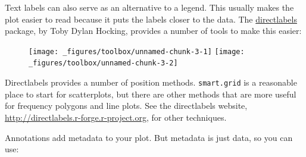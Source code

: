 Text labels can also serve as an alternative to a legend. This usually
makes the plot easier to read because it puts the labels closer to the
data. The \href{https://github.com/tdhock/directlabels}{directlabels}
package, by Toby Dylan Hocking, provides a number of tools to make this
easier: 

\begin{Shaded}
\begin{Highlighting}[]
 \StringTok{ }
\StringTok{  }\NormalTok{()}

 \StringTok{ }
\StringTok{  }\NormalTok{(} \NormalTok{) +}
\StringTok{  }\NormalTok{(}\NormalTok{(}  \NormalTok{)}
\end{Highlighting}
\end{Shaded}

\begin{figure}[H]
  \texttt{[image: \_figures/toolbox/unnamed-chunk-3-1]}%
  \texttt{[image: \_figures/toolbox/unnamed-chunk-3-2]}
\end{figure}

Directlabels provides a number of position methods. \texttt{smart.grid}
is a reasonable place to start for scatterplots, but there are other
methods that are more useful for frequency polygons and line plots. See
the directlabels website,
\url{http://directlabels.r-forge.r-project.org}, for other techniques.


Annotations add metadata to your plot. But metadata is just data, so you
can use:  

